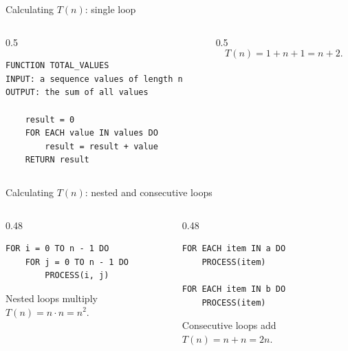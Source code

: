 \documentclass[aspectratio=169]{beamer}
\begin{document}
\begin{frame}[fragile]{Calculating $T(n)$: single loop}
  \begin{columns}[T]
    \begin{column}{0.5\textwidth}
\begin{lstlisting}[style=pseudo]
FUNCTION TOTAL_VALUES
INPUT: a sequence values of length n
OUTPUT: the sum of all values

    result = 0
    FOR EACH value IN values DO
        result = result + value
    RETURN result
\end{lstlisting}
    \end{column}
    \begin{column}{0.5\textwidth}
        \[
          T(n)=1+n+1=n+2.
        \]
    \end{column}
  \end{columns}
\end{frame}



\begin{frame}[fragile]{Calculating $T(n)$: nested and consecutive loops}
  \small
  \begin{columns}[T]
    \begin{column}{0.48\textwidth}
\begin{lstlisting}[style=pseudo]
FOR i = 0 TO n - 1 DO
    FOR j = 0 TO n - 1 DO
        PROCESS(i, j)
\end{lstlisting}
      \begin{block}{Nested loops multiply}
         $T(n)=n\cdot n=n^2$.
      \end{block}
    \end{column}
    \begin{column}{0.48\textwidth}
\begin{lstlisting}[style=pseudo]
FOR EACH item IN a DO
    PROCESS(item)

FOR EACH item IN b DO
    PROCESS(item)
      \end{lstlisting}
      \begin{exampleblock}{Consecutive loops add}
        $T(n)=n+n=2n$. 
      \end{exampleblock}
    \end{column}
  \end{columns}
\end{frame}
\end{document}
